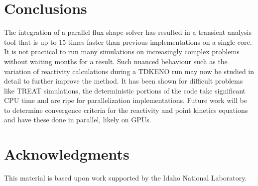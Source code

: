 \documentclass{anstrans}
\begin{document}
\section{Conclusions}
The integration of a parallel flux shape solver has resulted in a transient analysis tool that is up to 15 times faster than previous implementations on a single core.  It is not practical to run many simulations on increasingly complex problems without waiting months for a result. Such nuanced behaviour such as the variation of reactivity calculations during a TDKENO run may now be studied in detail to further improve the method.  It has been shown for difficult problems like TREAT simulations, the deterministic portions of the code take significant CPU time and are ripe for parallelization implementations. Future work will be to determine convergence criteria for the reactivity and point kinetics equations and have these done in parallel, likely on GPUs. 


\section{Acknowledgments}
This material is based upon work supported by the Idaho National Laboratory.



\end{document}

